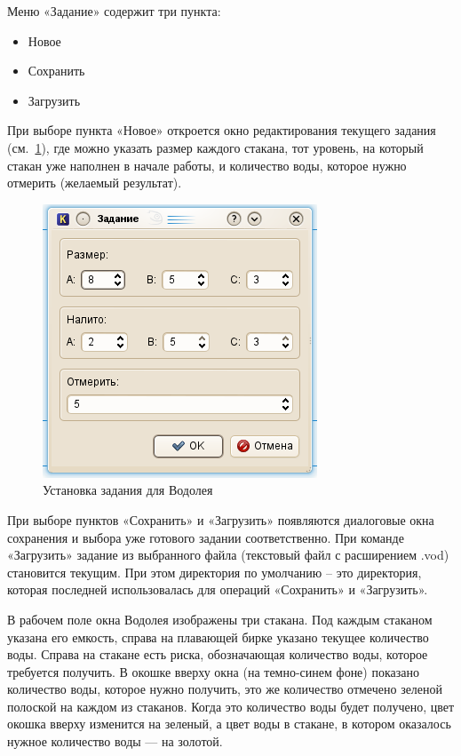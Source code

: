 Меню «Задание» содержит три пункта:
\begin{itemize}
\item Новое
\item Сохранить
\item Загрузить
\end{itemize}

При выборе пункта «Новое» откроется окно редактирования текущего задания (см.~\ref{vodoley-task}), где можно указать размер каждого стакана, тот уровень, на который стакан уже наполнен в начале работы, и количество воды, которое нужно отмерить (желаемый результат).
\begin{figure}[h]
	\begin{center}
		\includegraphics[scale=0.6]{vodoley-task.png}
	\end{center}
	\caption{Установка задания для Водолея}
\label{vodoley-task}
\end{figure}

При выборе пунктов «Сохранить» и «Загрузить» появляются диалоговые окна сохранения и выбора уже готового задании соответственно. При команде «Загрузить»  задание из выбранного файла (текстовый файл с расширением \textsf{.vod}) становится текущим. При этом директория по умолчанию – это директория, которая последней использовалась для операций «Сохранить» и «Загрузить».

В рабочем поле окна Водолея изображены три стакана. Под каждым стаканом указана его емкость, справа на плавающей бирке указано текущее количество воды. Справа на стакане есть риска, обозначающая количество воды, которое требуется получить. В окошке вверху окна (на темно-синем фоне) показано количество воды,  которое нужно получить, это же количество отмечено зеленой полоской на каждом из стаканов. Когда это количество воды будет получено, цвет окошка вверху изменится на зеленый, а цвет воды в стакане, в котором оказалось нужное количество воды --- на золотой.

